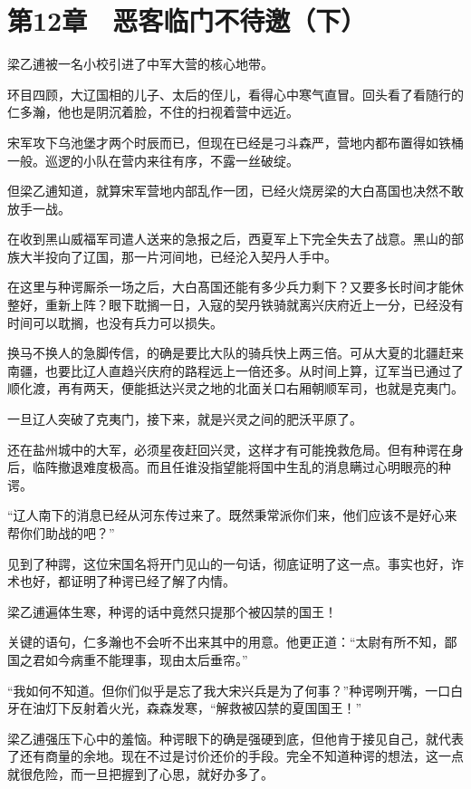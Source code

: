 \section{第12章　恶客临门不待邀（下）}

梁乙逋被一名小校引进了中军大营的核心地带。

环目四顾，大辽国相的儿子、太后的侄儿，看得心中寒气直冒。回头看了看随行的仁多瀚，他也是阴沉着脸，不住的扫视着营中远近。

宋军攻下乌池堡才两个时辰而已，但现在已经是刁斗森严，营地内都布置得如铁桶一般。巡逻的小队在营内来往有序，不露一丝破绽。

但梁乙逋知道，就算宋军营地内部乱作一团，已经火烧房梁的大白髙国也决然不敢放手一战。

在收到黑山威福军司遣人送来的急报之后，西夏军上下完全失去了战意。黑山的部族大半投向了辽国，那一片河间地，已经沦入契丹人手中。

在这里与种谔厮杀一场之后，大白髙国还能有多少兵力剩下？又要多长时间才能休整好，重新上阵？眼下耽搁一日，入寇的契丹铁骑就离兴庆府近上一分，已经没有时间可以耽搁，也没有兵力可以损失。

换马不换人的急脚传信，的确是要比大队的骑兵快上两三倍。可从大夏的北疆赶来南疆，也要比辽人直趋兴庆府的路程远上一倍还多。从时间上算，辽军当已通过了顺化渡，再有两天，便能抵达兴灵之地的北面关口右厢朝顺军司，也就是克夷门。

一旦辽人突破了克夷门，接下来，就是兴灵之间的肥沃平原了。

还在盐州城中的大军，必须星夜赶回兴灵，这样才有可能挽救危局。但有种谔在身后，临阵撤退难度极高。而且任谁没指望能将国中生乱的消息瞒过心明眼亮的种谔。

“辽人南下的消息已经从河东传过来了。既然秉常派你们来，他们应该不是好心来帮你们助战的吧？”

见到了种諤，这位宋国名将开门见山的一句话，彻底证明了这一点。事实也好，诈术也好，都证明了种谔已经了解了内情。

梁乙逋遍体生寒，种谔的话中竟然只提那个被囚禁的国王！

关键的语句，仁多瀚也不会听不出来其中的用意。他更正道：“太尉有所不知，鄙国之君如今病重不能理事，现由太后垂帘。”

“我如何不知道。但你们似乎是忘了我大宋兴兵是为了何事？”种谔咧开嘴，一口白牙在油灯下反射着火光，森森发寒，“解救被囚禁的夏国国王！”

梁乙逋强压下心中的羞恼。种谔眼下的确是强硬到底，但他肯于接见自己，就代表了还有商量的余地。现在不过是讨价还价的手段。完全不知道种谔的想法，这一点就很危险，而一旦把握到了心思，就好办多了。

